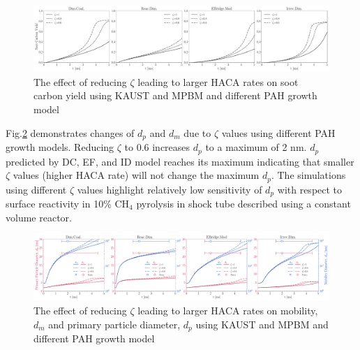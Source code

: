\begin{figure}[H]
	\centering
	\includegraphics[width=1\textwidth]{Figures/Results/Shocktube/Stanford/TEM/sy_all_zetaeffect.pdf}
	\caption{The effect of reducing $\zeta$ leading to larger HACA rates on soot carbon yield using KAUST and MPBM and different PAH growth model}
	\label{fig:shocktube_sy_zetseffect} 
\end{figure}

Fig.\ref{fig:shocktube_ddd_zetseffect} demonstrates changes of $d_p$ and $d_m$ due to $\zeta$ values using different PAH growth models. Reducing $\zeta$ to 0.6 increases $d_p$ to a maximum of 2 nm. $d_p$ predicted by DC, EF, and ID model reaches its maximum indicating that smaller $\zeta$ values (higher HACA rate) will not change the maximum $d_p$. The simulations using different $\zeta$ values highlight relatively low sensitivity of $d_p$ with respect to surface reactivity in 10\% $\mathrm{CH_4}$ pyrolysis in shock tube described using a constant volume reactor.

\begin{figure}[H]
	\centering
	\includegraphics[width=1\textwidth]{Figures/Results/Shocktube/Stanford/TEM/dp_dm_zetaeffect.pdf}
	\caption{The effect of reducing $\zeta$ leading to larger HACA rates on mobility, $d_m$ and primary particle diameter, $d_p$ using KAUST and MPBM and different PAH growth model}
	\label{fig:shocktube_ddd_zetseffect} 
\end{figure}